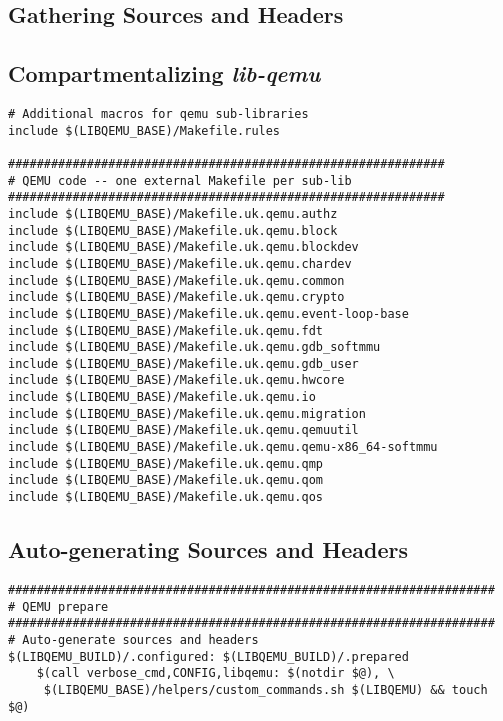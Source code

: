 \subsection{Gathering Sources and Headers}
\label{subsec:gathering-sources-headers}

\subsection{Compartmentalizing \textit{lib-qemu}}
\label{subsec:compartmentalizing-qemu}

\begin{lstlisting}
# Additional macros for qemu sub-libraries
include $(LIBQEMU_BASE)/Makefile.rules

#############################################################
# QEMU code -- one external Makefile per sub-lib
#############################################################
include $(LIBQEMU_BASE)/Makefile.uk.qemu.authz
include $(LIBQEMU_BASE)/Makefile.uk.qemu.block
include $(LIBQEMU_BASE)/Makefile.uk.qemu.blockdev
include $(LIBQEMU_BASE)/Makefile.uk.qemu.chardev
include $(LIBQEMU_BASE)/Makefile.uk.qemu.common
include $(LIBQEMU_BASE)/Makefile.uk.qemu.crypto
include $(LIBQEMU_BASE)/Makefile.uk.qemu.event-loop-base
include $(LIBQEMU_BASE)/Makefile.uk.qemu.fdt
include $(LIBQEMU_BASE)/Makefile.uk.qemu.gdb_softmmu
include $(LIBQEMU_BASE)/Makefile.uk.qemu.gdb_user
include $(LIBQEMU_BASE)/Makefile.uk.qemu.hwcore
include $(LIBQEMU_BASE)/Makefile.uk.qemu.io
include $(LIBQEMU_BASE)/Makefile.uk.qemu.migration
include $(LIBQEMU_BASE)/Makefile.uk.qemu.qemuutil
include $(LIBQEMU_BASE)/Makefile.uk.qemu.qemu-x86_64-softmmu
include $(LIBQEMU_BASE)/Makefile.uk.qemu.qmp
include $(LIBQEMU_BASE)/Makefile.uk.qemu.qom
include $(LIBQEMU_BASE)/Makefile.uk.qemu.qos
\end{lstlisting}

\subsection{Auto-generating Sources and Headers}
\label{subsec:autogenerating-sources-headers}

\begin{lstlisting}
####################################################################
# QEMU prepare
####################################################################
# Auto-generate sources and headers
$(LIBQEMU_BUILD)/.configured: $(LIBQEMU_BUILD)/.prepared
    $(call verbose_cmd,CONFIG,libqemu: $(notdir $@), \
     $(LIBQEMU_BASE)/helpers/custom_commands.sh $(LIBQEMU) && touch $@)
\end{lstlisting}

